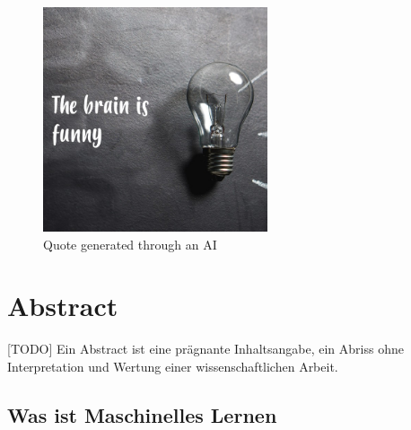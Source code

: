 \documentclass{thesisclass}
\begin{document}



\frontmatter
{}

\blankpage

\blankpage

\vspace*{\fill}
\begin{figure}[h]
  \center
  \includegraphics[width=250px]{images/inspirobotQuote.jpg}
  \caption{Quote generated through an AI \cite{inspirobot}}
  \label{fig:Inspirational quote by AI}
\end{figure}
\vspace*{\fill}\clearpage

\tableofcontents
\cleardoublepage

%




\chapter{Abstract}
[TODO] Ein Abstract ist eine prägnante Inhaltsangabe, ein Abriss ohne Interpretation und Wertung einer wissenschaftlichen Arbeit.
\newpage

\section{Was ist Maschinelles Lernen}
\end{document}

